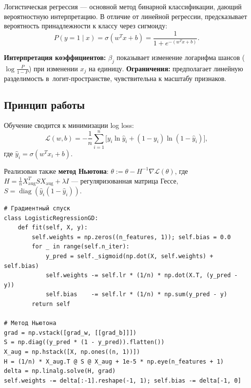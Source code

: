 \documentclass[12pt,a4paper]{article}
\begin{document}
Логистическая регрессия — основной метод бинарной классификации,
дающий вероятностную интерпретацию. В отличие от линейной регрессии,
предсказывает вероятность принадлежности к классу через сигмоиду:
\[
P(y = 1 \mid x) = \sigma(w^T x + b) = \frac{1}{1 + e^{-(w^T x + b)}}.
\]

\textbf{Интерпретация коэффициентов:} \(\beta_j\) показывает изменение
логарифма шансов (\(\log\frac{P}{1-P}\)) при изменении \(x_j\) на
единицу. \textbf{Ограничения:} предполагает линейную разделимость
в~логит-пространстве, чувствительна к масштабу признаков.

\subsection{Принцип работы}

Обучение сводится к минимизации log loss:
\[
\mathcal{L}(w, b) = -\frac{1}{n} \sum_{i=1}^{n}
\bigl[ y_i \ln \hat{y}_i + (1 - y_i) \ln (1 - \hat{y}_i) \bigr],
\]
где \(\hat{y}_i = \sigma(w^T x_i + b)\).


\medskip
Реализован также \textbf{метод Ньютона}: \(\theta := \theta - H^{-1} \nabla \mathcal{L}(\theta)\),
где \(H = \frac{1}{n} X_{\text{aug}}^T S X_{\text{aug}} + \lambda I\) —
регуляризованная матрица Гессе, \(S = \operatorname{diag}(\hat{y}_i(1-\hat{y}_i))\).

\begin{lstlisting}[caption={Градиентный спуск и метод Ньютона},label={lst:lr}]
# Градиентный спуск
class LogisticRegressionGD:
    def fit(self, X, y):
        self.weights = np.zeros((n_features, 1)); self.bias = 0.0
        for _ in range(self.n_iter):
            y_pred = self._sigmoid(np.dot(X, self.weights) + self.bias)
            self.weights -= self.lr * (1/n) * np.dot(X.T, (y_pred - y))
            self.bias    -= self.lr * (1/n) * np.sum(y_pred - y)
        return self

# Метод Ньютона
grad = np.vstack([grad_w, [[grad_b]]])
S = np.diag((y_pred * (1 - y_pred)).flatten())
X_aug = np.hstack([X, np.ones((n, 1))])
H = (1/n) * X_aug.T @ S @ X_aug + 1e-5 * np.eye(n_features + 1)
delta = np.linalg.solve(H, grad)
self.weights -= delta[:-1].reshape(-1, 1); self.bias -= delta[-1, 0]
\end{lstlisting}
\end{document}
